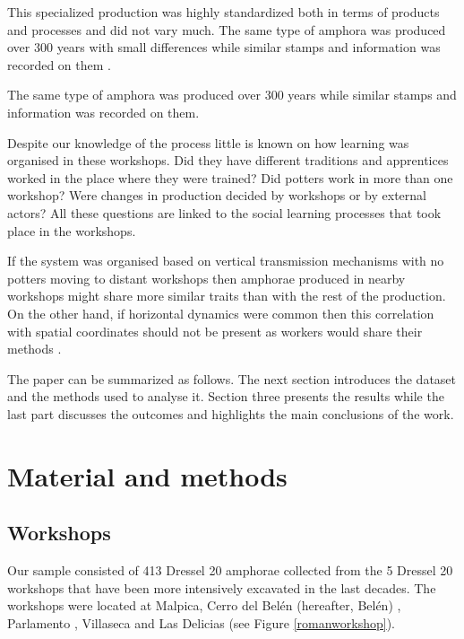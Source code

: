 \documentclass[review]{elsarticle}
\begin{document}
This specialized production was highly standardized both in terms of products and processes and did not vary much. The same type of amphora was produced over 300 years with small differences while similar stamps and information was recorded on them \cite{coto-sarmiento_maria_bayesian_????}. 


The same type of amphora was produced over 300 years while similar stamps and information was recorded on them. 

Despite our knowledge of the process little is known on how learning was organised in these workshops. Did they have different traditions and apprentices worked in the place where they were trained? Did potters work in more than one workshop? Were changes in production decided by workshops or by external actors? All these questions are linked to the social learning processes that took place in the workshops. 

If the system was organised based on vertical transmission mechanisms with no potters moving to distant workshops then amphorae produced in nearby workshops might share more similar traits than with the rest of the production. On the other hand, if horizontal dynamics were common then this correlation with spatial coordinates should not be present as workers would share their methods \citep{hosfield_modes_2009}. 


The paper can be summarized as follows. The next section introduces the dataset and the methods used to analyse it. Section three presents the results while the last part discusses the outcomes and highlights the main conclusions of the work. 

\section{Material and methods}

\subsection{Workshops}

Our sample consisted of 413 Dressel 20 amphorae collected from the 5 Dressel 20 workshops that have been more intensively excavated in the last decades. The workshops were located at Malpica, Cerro del Belén (hereafter, Belén) \citep{diaz_trujillo_excavacion_1992}, Parlamento \citep{garcia_vargas_anforas_2000}, Villaseca\citep{garcia_vargas_enrique_excavacion_????} and Las Delicias \citep{fernandez_excavacion_2001,_atelier_2014} (see Figure \ref{romanworkshop}).
\end{document}
